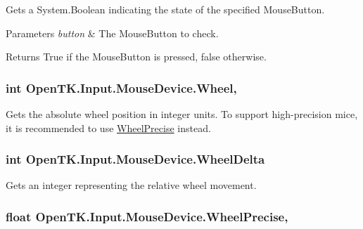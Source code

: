 Gets a System.\-Boolean indicating the state of the specified Mouse\-Button. 


\begin{DoxyParams}{Parameters}
{\em button} & The Mouse\-Button to check.\\
\hline
\end{DoxyParams}
\begin{DoxyReturn}{Returns}
True if the Mouse\-Button is pressed, false otherwise.
\end{DoxyReturn}
\hypertarget{class_open_t_k_1_1_input_1_1_mouse_device_a903b16fe9f4b3b1054cfbc8051b3752b}{
\subsubsection[{Wheel}]{\setlength{\rightskip}{0pt plus 5cm}int Open\-T\-K.\-Input.\-Mouse\-Device.\-Wheel\hspace{0.3cm}{\ttfamily [get]}, {\ttfamily [set]}}}\label{class_open_t_k_1_1_input_1_1_mouse_device_a903b16fe9f4b3b1054cfbc8051b3752b}


Gets the absolute wheel position in integer units. To support high-\/precision mice, it is recommended to use \hyperlink{class_open_t_k_1_1_input_1_1_mouse_device_ace88f976bb7b736216cf785f3679dadd}{Wheel\-Precise} instead. 

\hypertarget{class_open_t_k_1_1_input_1_1_mouse_device_a834230a316172123e7dc9eccdfe9ac5c}{
\subsubsection[{Wheel\-Delta}]{\setlength{\rightskip}{0pt plus 5cm}int Open\-T\-K.\-Input.\-Mouse\-Device.\-Wheel\-Delta\hspace{0.3cm}{\ttfamily [get]}}}\label{class_open_t_k_1_1_input_1_1_mouse_device_a834230a316172123e7dc9eccdfe9ac5c}


Gets an integer representing the relative wheel movement. 

\hypertarget{class_open_t_k_1_1_input_1_1_mouse_device_ace88f976bb7b736216cf785f3679dadd}{
\subsubsection[{Wheel\-Precise}]{\setlength{\rightskip}{0pt plus 5cm}float Open\-T\-K.\-Input.\-Mouse\-Device.\-Wheel\-Precise\hspace{0.3cm}{\ttfamily [get]}, {\ttfamily [set]}}}\label{class_open_t_k_1_1_input_1_1_mouse_device_ace88f976bb7b736216cf785f3679dadd}


